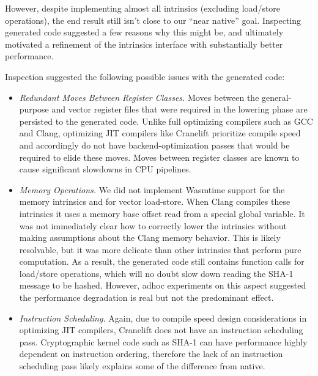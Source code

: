 \begin{center}

\end{center}

However, despite implementing almost all intrinsics (excluding load/store
operations), the end result still isn't close to our ``near native'' goal.
Inspecting generated code suggested a few reasons why this might be, and
ultimately motivated a refinement of the intrinsics interface with substantially
better performance.

Inspection suggested the following possible issues with the generated code:
%
\begin{itemize}
    \item \emph{Redundant Moves Between Register Classes.}
        Moves between the general-purpose and vector register files that were
        required in the lowering phase are persisted to the generated code.
        Unlike full optimizing compilers such as GCC and Clang, optimizing JIT
        compilers like Cranelift prioritize compile speed and accordingly do not
        have backend-optimization passes that would be required to elide these
        moves. Moves between register classes are known to cause significant
        slowdowns in CPU pipelines.
    \item \emph{Memory Operations.}
        We did not implement Wasmtime support for the memory intrinsics
         and  for vector load-store. When
        Clang compiles these intrinsics it uses a memory base offset read from a
        special global variable. It was not immediately clear how to correctly
        lower the intrinsics without making assumptions about the Clang memory
        behavior. This is likely resolvable, but it was more delicate than other
        intrinsics that perform pure computation. As a result, the generated
        code still contains function calls for load/store operations, which will
        no doubt slow down reading the SHA-1 message to be hashed. However,
        adhoc experiments on this aspect suggested the performance degradation
        is real but not the predominant effect.
    \item \emph{Instruction Scheduling.}
        Again, due to compile speed design considerations in optimizing JIT
        compilers, Cranelift does not have an instruction scheduling pass.
        Cryptographic kernel code such as SHA-1 can have performance highly
        dependent on instruction ordering, therefore the lack of an instruction
        scheduling pass likely explains some of the difference from native.
\end{itemize}

